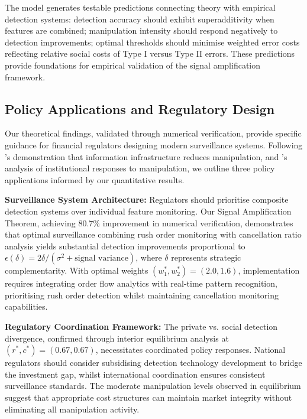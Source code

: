 \documentclass[12pt]{article}
\begin{document}
The model generates testable predictions connecting theory with empirical detection systems: detection accuracy should exhibit superadditivity when features are combined; manipulation intensity should respond negatively to detection improvements; optimal thresholds should minimise weighted error costs reflecting relative social costs of Type I versus Type II errors. These predictions provide foundations for empirical validation of the signal amplification framework.

\subsection{Policy Applications and Regulatory Design}

Our theoretical findings, validated through numerical verification, provide specific guidance for financial regulators designing modern surveillance systems. Following \citet{xiong2024information}'s demonstration that information infrastructure reduces manipulation, and \citet{wang2024information}'s analysis of institutional responses to manipulation, we outline three policy applications informed by our quantitative results.

\textbf{Surveillance System Architecture:} Regulators should prioritise composite detection systems over individual feature monitoring. Our Signal Amplification Theorem, achieving 80.7\% improvement in numerical verification, demonstrates that optimal surveillance combining rush order monitoring with cancellation ratio analysis yields substantial detection improvements proportional to $\epsilon(\delta) = 2\delta/(\sigma^2 + \text{signal variance})$, where $\delta$ represents strategic complementarity. With optimal weights $(w_1^*, w_2^*) = (2.0, 1.6)$, implementation requires integrating order flow analytics with real-time pattern recognition, prioritising rush order detection whilst maintaining cancellation monitoring capabilities.

\textbf{Regulatory Coordination Framework:} The private vs. social detection divergence, confirmed through interior equilibrium analysis at $(r^*, c^*) = (0.67, 0.67)$, necessitates coordinated policy responses. National regulators should consider subsidising detection technology development to bridge the investment gap, whilst international coordination ensures consistent surveillance standards. The moderate manipulation levels observed in equilibrium suggest that appropriate cost structures can maintain market integrity without eliminating all manipulation activity.
\end{document}
